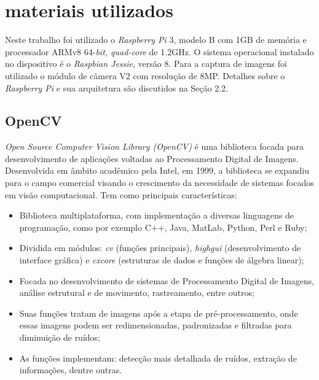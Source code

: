 \documentclass[12pt,oneside,a4paper,chapter=TITLE,section=TITLE,sumario=tradicional]{abntex2}
\begin{document}
\section{materiais utilizados}

Neste trabalho foi utilizado o \textit{Raspberry Pi} 3, modelo B com 1GB de memória e processador ARMv8 64-\textit{bit, quad-core} de 1.2GHz. O sistema operacional instalado no dispositivo é o \textit{Raspbian Jessie}, versão 8. Para a captura de imagens foi utilizado o módulo de câmera V2 com resolução de 8MP. Detalhes sobre o \textit{Raspberry Pi} e sua arquitetura são discutidos na Seção 2.2.

\subsection{OpenCV}
\textit{Open Source Computer Vision Library (OpenCV)} é uma biblioteca focada para desenvolvimento de aplicações voltadas ao Processamento Digital de Imagens. Desenvolvida em âmbito acadêmico pela Intel, em 1999, a biblioteca se expandiu para o campo comercial visando o crescimento da necessidade de sistemas focados em visão computacional. Tem como principais características:
\begin{lista}
	\begin{itemize}
	    \item Biblioteca multiplataforma, com implementação a diversas linguagens de programação, como por exemplo C++, Java, MatLab, Python, Perl e Ruby;
	\end{itemize}
	\begin{itemize}
	    \item Dividida em módulos: \textit{cv} (funções principais), \textit{highgui} (desenvolvimento de interface gráfica) e \textit{cxcore} (estruturas de dados e funções de álgebra linear);
	\end{itemize}
	\begin{itemize}
	    \item Focada no desenvolvimento de sistemas de Processamento Digital de Imagens, análise estrutural e de movimento, rastreamento, entre outros;
	\end{itemize}
	\begin{itemize}
	    \item Suas funções tratam de imagens após a etapa de pré-processamento, onde essas imagens podem ser redimensionadas, padronizadas e filtradas para diminuição de ruídos;
	\end{itemize}
	\begin{itemize}
	    \item As funções implementam: detecção mais detalhada de ruídos, extração de informações, dentre outras.
	\end{itemize}
\end{lista}
\end{document}
